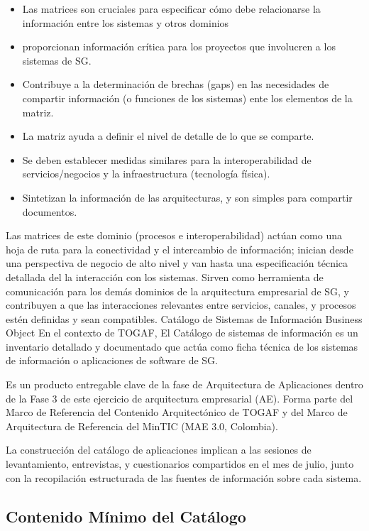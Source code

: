 \documentclass[
	a4paper, %
	12pt, %
]{include/CSSullivanBusinessReport}
\def\tightlist{}
\begin{document}
\begin{itemize}
\tightlist
\item
  Las matrices son cruciales para especificar cómo debe relacionarse la
  información entre los sistemas y otros dominios
\item
  proporcionan información crítica para los proyectos que involucren a
  los sistemas de SG.
\item
  Contribuye a la determinación de brechas (gaps) en las necesidades de
  compartir información (o funciones de los sistemas) ente los elementos
  de la matriz.
\item
  La matriz ayuda a definir el nivel de detalle de lo que se comparte.
\item
  Se deben establecer medidas similares para la interoperabilidad de
  servicios/negocios y la infraestructura (tecnología física).
\item
  Sintetizan la información de las arquitecturas, y son simples para
  compartir documentos.
\end{itemize}

Las matrices de este dominio (procesos e interoperabilidad) actúan como
una hoja de ruta para la conectividad y el intercambio de información;
inician desde una perspectiva de negocio de alto nivel y van hasta una
especificación técnica detallada del la interacción con los sistemas.
Sirven como herramienta de comunicación para los demás dominios de la
arquitectura empresarial de SG, y contribuyen a que las interacciones
relevantes entre servicios, canales, y procesos estén definidas y sean
compatibles. \textbar{} \textbar{} Catálogo de Sistemas de Información
\textbar{} Business Object \textbar{} En el contexto de TOGAF, El
Catálogo de sistemas de información es un inventario detallado y
documentado que actúa como ficha técnica de los sistemas de información
o aplicaciones de software de SG.

Es un producto entregable clave de la fase de Arquitectura de
Aplicaciones dentro de la Fase 3 de este ejercicio de arquitectura
empresarial (AE). Forma parte del Marco de Referencia del Contenido
Arquitectónico de TOGAF y del Marco de Arquitectura de Referencia del
MinTIC (MAE 3.0, Colombia).

La construcción del catálogo de aplicaciones implican a las sesiones de
levantamiento, entrevistas, y cuestionarios compartidos en el mes de
julio, junto con la recopilación estructurada de las fuentes de
información sobre cada sistema.

\subsection{Contenido Mínimo del
Catálogo}\label{sec:contenido-muxednimo-del-catuxe1logo}
\end{document}
